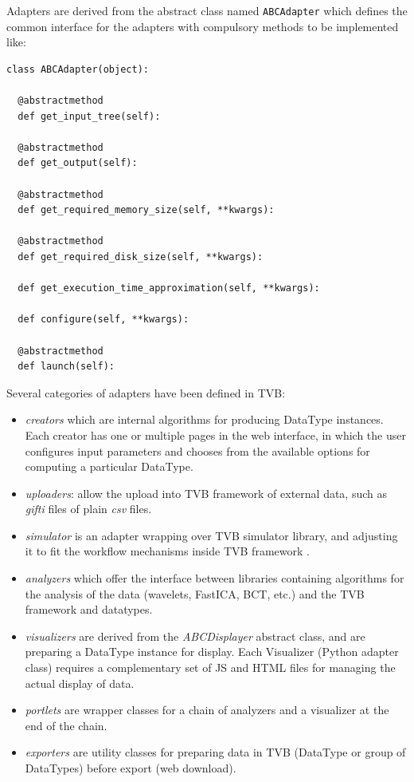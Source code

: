 Adapters are derived from the abstract class named \texttt{ABCAdapter} which
defines the common interface for the adapters with compulsory methods to be implemented like:

\begin{lstlisting}
class ABCAdapter(object):

  @abstractmethod
  def get_input_tree(self):

  @abstractmethod
  def get_output(self):

  @abstractmethod
  def get_required_memory_size(self, **kwargs):

  @abstractmethod
  def get_required_disk_size(self, **kwargs):

  def get_execution_time_approximation(self, **kwargs):

  def configure(self, **kwargs):

  @abstractmethod
  def launch(self):
\end{lstlisting}

Several categories of adapters have been defined in TVB: 

\begin{itemize}
	\item \textit{creators} which are internal algorithms for producing DataType instances. 
		Each creator has one or multiple pages in the web interface, in which the user
		 configures input parameters and chooses from the available options for computing a particular DataType.

	\item \textit{uploaders}: allow the upload into TVB framework of external data, 
    		such as \emph{gifti} files of plain \emph{csv} files.

	\item \textit{simulator} is an adapter wrapping over TVB simulator library, and adjusting it to fit
		the workflow mechanisms inside TVB framework .

	\item \textit{analyzers} which offer the interface between libraries containing algorithms 
		for the analysis of the data (wavelets, FastICA, BCT, etc.) and the TVB framework and datatypes.

	\item \textit{visualizers} are derived from the \emph{ABCDisplayer} abstract class, and are preparing  
		a DataType instance for display. Each Visualizer (Python adapter class) requires a complementary set
		of JS and HTML files for managing the actual display of data.

	\item \textit{portlets} are wrapper classes for a chain of analyzers and a visualizer at the end of the chain.

	\item \textit{exporters} are utility classes for preparing data in TVB (DataType or group of DataTypes)
		before export (web download).
\end{itemize}

